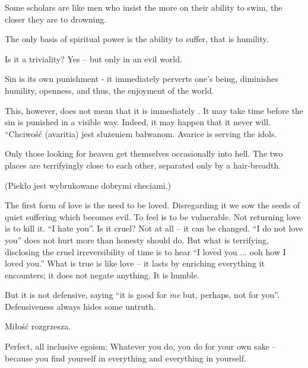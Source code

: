 \pa Some scholars are like men who insist the more on their ability to swim, the
closer they are to drowning.



\pa
The only basis of spiritual power is the ability to suffer, that is humility.

\pa
{} Is 
it a triviality? Yes -- but only in an evil world.

\pa
Sin is its own punishment - it immediately perverts one's being, diminishes 
humility, openness, and thus, the enjoyment of the world.

This, however, does not mean that it is immediately \LL. It may take
time before the sin is punished in a visible way. Indeed, it may 
happen that it never will. 
\pa
``Chciwo\'s\'c (avaritia) jest s{\l}u\.zeniem ba{\l}wanom. 
Avarice is serving the idols.

\pa
Only those looking for heaven get themselves occasionally into hell. The two
places are terrifyingly close to each other, separated only by a hair-breadth.

(Piek{\l}o jest wybrukowane dobrymi checiami.)


\pa
The first form of love is the need to be loved. Disregarding it we sow the
seeds of quiet suffering which becomes evil.
\pa
To feel is to be vulnerable.
\pa
Not returning love is to kill it.
\pa
``I hate you''. Is it cruel? Not at all -- it can be changed. ``I do
not love you'' does not hurt more than honesty should do. But what is
terrifying, disclosing the cruel irreversibility of time is to hear
``I loved you ... ooh how I loved you.''
\pa
What is true is like love -- it lasts by enriching everything it
encounters; it does not negate anything. It is humble.

But it is not defensive, saying ``it is good for {\em me} but,
perhaps, not for you''. Defensiveness always hides some untruth.

\pa
Mi{\l}o\'s\'c rozgrzesza.

\pa
Perfect, all inclusive egoism: Whatever you do, you do for your own 
sake -- because you find yourself in everything and everything in 
yourself.


